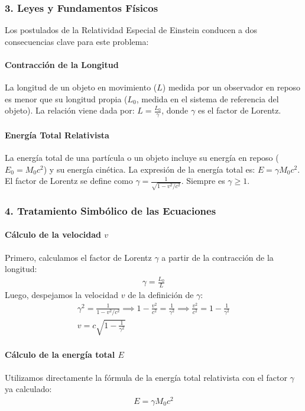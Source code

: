 \subsubsection*{3. Leyes y Fundamentos Físicos}
Los postulados de la Relatividad Especial de Einstein conducen a dos consecuencias clave para este problema:
\paragraph*{Contracción de la Longitud}
La longitud de un objeto en movimiento ($L$) medida por un observador en reposo es menor que su longitud propia ($L_0$, medida en el sistema de referencia del objeto). La relación viene dada por: $L = \frac{L_0}{\gamma}$, donde $\gamma$ es el factor de Lorentz.
\paragraph*{Energía Total Relativista}
La energía total de una partícula o un objeto incluye su energía en reposo ($E_0=M_0c^2$) y su energía cinética. La expresión de la energía total es: $E = \gamma M_0 c^2$.
El factor de Lorentz se define como $\gamma = \frac{1}{\sqrt{1 - v^2/c^2}}$. Siempre es $\gamma \ge 1$.

\subsubsection*{4. Tratamiento Simbólico de las Ecuaciones}
\paragraph*{Cálculo de la velocidad $v$}
Primero, calculamos el factor de Lorentz $\gamma$ a partir de la contracción de la longitud:
\begin{gather}
    \gamma = \frac{L_0}{L}
\end{gather}
Luego, despejamos la velocidad $v$ de la definición de $\gamma$:
\begin{gather}
    \gamma^2 = \frac{1}{1 - v^2/c^2} \implies 1 - \frac{v^2}{c^2} = \frac{1}{\gamma^2} \implies \frac{v^2}{c^2} = 1 - \frac{1}{\gamma^2} \nonumber \\
    v = c \sqrt{1 - \frac{1}{\gamma^2}}
\end{gather}
\paragraph*{Cálculo de la energía total $E$}
Utilizamos directamente la fórmula de la energía total relativista con el factor $\gamma$ ya calculado:
\begin{gather}
    E = \gamma M_0 c^2
\end{gather}

